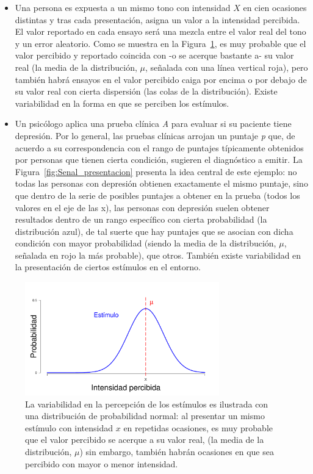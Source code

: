 \begin{itemize}
\item Una persona es expuesta a un mismo tono con intensidad $X$ en cien ocasiones distintas y tras cada presentación, asigna un valor a la intensidad percibida. El valor reportado en cada ensayo será una mezcla entre el valor real del tono y un error aleatorio. Como se muestra en la Figura~\ref{fig:Senal_percepcion}, es muy probable que el valor percibido y reportado coincida con -o se acerque bastante a- su valor real (la media de la distribución, $\mu$, señalada con una línea vertical roja), pero también habrá ensayos en el valor percibido caiga por encima o por debajo de su valor real con cierta dispersión (las colas de la distribución). Existe variabilidad en la forma en que se perciben los estímulos.\\

\item Un psicólogo aplica una prueba clínica \textit{A} para evaluar si su paciente tiene depresión. Por lo general, las pruebas clínicas arrojan un puntaje \textit{p} que, de acuerdo a su correspondencia con el rango de puntajes típicamente obtenidos por personas que tienen cierta condición, sugieren el diagnóstico a emitir. La Figura~\ref{fig:Senal_presentacion} presenta la idea central de este ejemplo: no todas las personas con depresión obtienen exactamente el mismo puntaje, sino que dentro de la serie de posibles puntajes a obtener en la prueba (todos los valores en el eje de las x), las personas con depresión suelen obtener resultados dentro de un rango específico con cierta probabilidad (la distribución azul), de tal suerte que hay puntajes que se asocian con dicha condición con mayor probabilidad (siendo la media de la distribución, $\mu$, señalada en rojo la más probable), que otros. También existe variabilidad en la presentación de ciertos estímulos en el entorno.\\
\end{itemize}

\begin{figure}[th]
\centering
\includegraphics[width=0.75\textwidth]{Figures/Signal_Perception} 
\caption[Variabilidad en la percepción de los estímulos]{La variabilidad en la percepción de los estímulos es ilustrada con una distribución de probabilidad normal: al presentar un mismo estímulo con intensidad $x$ en repetidas ocasiones, es muy probable que el valor percibido se acerque a su valor real, (la media de la distribución, $\mu$) sin embargo, también habrán ocasiones en que sea percibido con mayor o menor intensidad.}
\label{fig:Senal_percepcion}
\end{figure}


